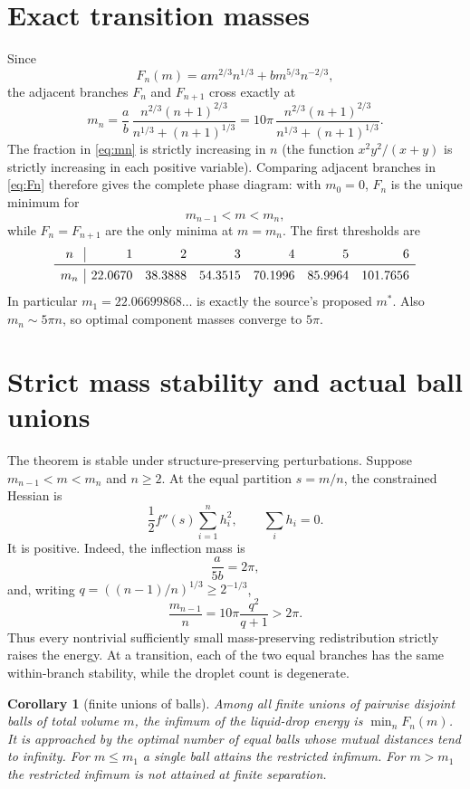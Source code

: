 \documentclass[11pt]{article}
\newtheorem{corollary}[theorem]{Corollary}
\begin{document}
\section{Exact transition masses}

Since
\begin{equation}\label{eq:Fn}
 F_n(m)=a m^{2/3}n^{1/3}+b m^{5/3}n^{-2/3},
\end{equation}
the adjacent branches $F_n$ and $F_{n+1}$ cross exactly at
\begin{equation}\label{eq:mn}
 m_n=\frac ab\,
 \frac{n^{2/3}(n+1)^{2/3}}
 {n^{1/3}+(n+1)^{1/3}}
 =10\pi\,
 \frac{n^{2/3}(n+1)^{2/3}}
 {n^{1/3}+(n+1)^{1/3}}.
\end{equation}
The fraction in \eqref{eq:mn} is strictly increasing in $n$ (the function
$x^2y^2/(x+y)$ is strictly increasing in each positive variable).  Comparing
adjacent branches in \eqref{eq:Fn} therefore gives the complete phase diagram:
with $m_0=0$, $F_n$ is the unique minimum for
\[
 m_{n-1}<m<m_n,
\]
while $F_n=F_{n+1}$ are the only minima at $m=m_n$.  The first thresholds are
\[
\begin{array}{c|rrrrrr}
n&1&2&3&4&5&6\\ \midrule
m_n&22.0670&38.3888&54.3515&70.1996&85.9964&101.7656
\end{array}
\]
In particular $m_1=22.06699868\ldots$ is exactly the source's proposed
$m^*$.  Also $m_n\sim5\pi n$, so optimal component masses converge to $5\pi$.

\section{Strict mass stability and actual ball unions}

The theorem is stable under structure-preserving perturbations.  Suppose
$m_{n-1}<m<m_n$ and $n\ge2$.  At the equal partition $s=m/n$, the constrained
Hessian is
\[
 \frac12 f''(s)\sum_{i=1}^n h_i^2,
 \qquad \sum_i h_i=0.
\]
It is positive.  Indeed, the inflection mass is
\[
 \frac{a}{5b}=2\pi,
\]
and, writing $q=((n-1)/n)^{1/3}\ge2^{-1/3}$,
\[
 \frac{m_{n-1}}n
 =10\pi\frac{q^2}{q+1}>2\pi.
\]
Thus every nontrivial sufficiently small mass-preserving redistribution
strictly raises the energy.  At a transition, each of the two equal branches
has the same within-branch stability, while the droplet count is degenerate.

\begin{corollary}[finite unions of balls]\label{cor:balls}
Among all finite unions of pairwise disjoint balls of total volume $m$, the
infimum of the liquid-drop energy is $\min_nF_n(m)$.  It is approached by
the optimal number of equal balls whose mutual distances tend to infinity.
For $m\le m_1$ a single ball attains the restricted infimum.  For $m>m_1$
the restricted infimum is not attained at finite separation.
\end{corollary}
\end{document}

